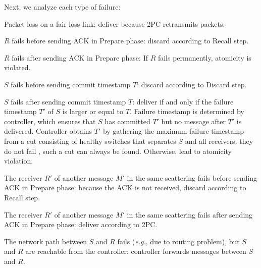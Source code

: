 Next, we analyze  each type of failure:
\begin{ecompact}
	\item Packet loss on a fair-loss link: deliver because 2PC retransmits packets.
	\item $R$ fails before sending ACK in Prepare phase: discard according to Recall step.
	\item $R$ fails after sending ACK in Prepare phase:  If $R$ fails permanently, atomicity is violated.
	\item $S$ fails before sending commit timestamp $T$: discard according to Discard step. 
	\item $S$ fails after sending commit timestamp $T$: deliver if and only if the failure timestamp $T'$ of $S$ is larger or equal to $T$. Failure timestamp is determined by controller, which ensures that $S$ has committed $T'$ but no message after $T'$ is delivered. Controller obtains $T'$ by gathering the maximum failure timestamp from a cut  consisting of healthy switches that separates $S$ and all receivers.  they do not fail , such a cut can always be found. Otherwise,  lead to atomicity violation.
	\item The receiver $R'$ of another message $M'$ in the same scattering fails before sending ACK in Prepare phase: because the ACK is not received, discard according to Recall step.
	\item The receiver $R'$ of another message $M'$ in the same scattering fails after sending ACK in Prepare phase: deliver according to 2PC.
	\item The network path between $S$ and $R$ fails (\textit{e.g.}, due to routing problem), but $S$ and $R$ are reachable from the controller: controller forwards messages between $S$ and $R$.

\end{ecompact}
